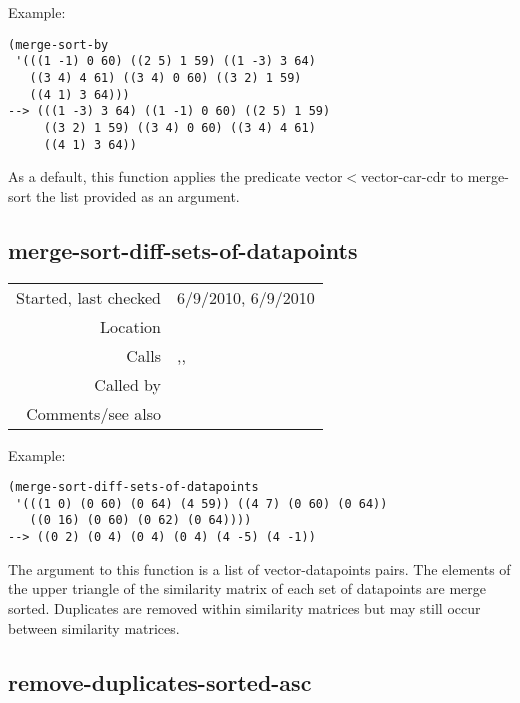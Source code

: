 \vspace{0.5cm}
\noindent Example:
\begin{verbatim}
(merge-sort-by
 '(((1 -1) 0 60) ((2 5) 1 59) ((1 -3) 3 64)
   ((3 4) 4 61) ((3 4) 0 60) ((3 2) 1 59)
   ((4 1) 3 64)))
--> (((1 -3) 3 64) ((1 -1) 0 60) ((2 5) 1 59)
     ((3 2) 1 59) ((3 4) 0 60) ((3 4) 4 61)
     ((4 1) 3 64))
\end{verbatim}

\noindent As a default, this function applies the
predicate vector$<$vector-car-cdr to merge-sort the
list provided as an argument.


\subsection*{merge-sort-diff-sets-of-datapoints}\label{fun:merge-sort-diff-sets-of-datapoints}

\vspace{0.3cm}
\begin{tabular}{r|p{8cm}}
Started, last checked & 6/9/2010, 6/9/2010 \\
Location & \nameref{sec:superdiagonals} \\
Calls & \nameref{fun:difference-list-sorted-asc},\newline \nameref{fun:remove-duplicates-sorted-asc},\newline \nameref{fun:vector<vector-t-or-nil} \\
Called by & \nameref{fun:structure-induction-algorithm-r} \\
Comments/see also & 
\end{tabular}

\vspace{0.5cm}
\noindent Example:
\begin{verbatim}
(merge-sort-diff-sets-of-datapoints
 '(((1 0) (0 60) (0 64) (4 59)) ((4 7) (0 60) (0 64))
   ((0 16) (0 60) (0 62) (0 64))))
--> ((0 2) (0 4) (0 4) (0 4) (4 -5) (4 -1))
\end{verbatim}

\noindent The argument to this function is a list of
vector-datapoints pairs. The elements of the upper
triangle of the similarity matrix of each set of
datapoints are merge sorted. Duplicates are removed
within similarity matrices but may still occur
between similarity matrices.


\subsection*{remove-duplicates-sorted-asc}\label{fun:remove-duplicates-sorted-asc}

